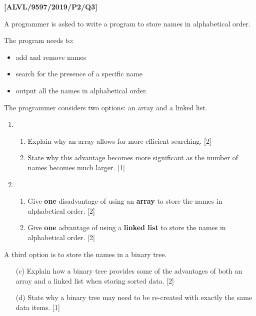 \item \textbf{{[}ALVL/9597/2019/P2/Q3{]} }

A programmer is asked to write a program to store names in alphabetical
order.

The program needs to:
\begin{itemize}
\item add and remove names
\item search for the presence of a specific name
\item output all the names in alphabetical order. 
\end{itemize}
The programmer considers two options: an array and a linked list.
\begin{enumerate}
\item {}
\begin{enumerate}
\item Explain why an array allows for more efficient searching. \hfill{}{[}2{]}
\item State why this advantage becomes more significant as the number of
names becomes much larger. \hfill{}{[}1{]}
\end{enumerate}
\item {}
\begin{enumerate}
\item Give \textbf{one} disadvantage of using an \textbf{array} to store
the names in alphabetical order. \hfill{}{[}2{]}
\item Give \textbf{one} advantage of using a \textbf{linked list} to store
the names in alphabetical order. \hfill{}{[}2{]}
\end{enumerate}
\end{enumerate}
A third option is to store the names in a binary tree.
\begin{enumerate}
\item[(c)] Explain how a binary tree provides some of the advantages of both
an array and a linked list when storing sorted data. \hfill{}{[}2{]}
\item[(d)] State why a binary tree may need to be re-created with exactly the
same data items. \hfill{}{[}1{]}
\end{enumerate}